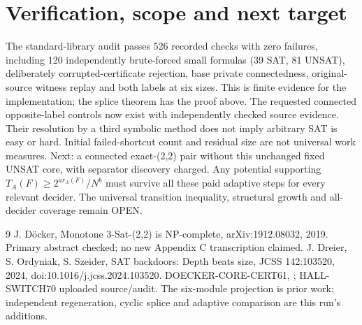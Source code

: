 \documentclass[11pt]{article}
\begin{document}
\section{Verification, scope and next target}
The standard-library audit passes 526 recorded checks with zero failures, including 120 independently brute-forced small formulas (39 SAT, 81 UNSAT), deliberately corrupted-certificate rejection, base private connectedness, original-source witness replay and both labels at six sizes. This is finite evidence for the implementation; the splice theorem has the proof above.
The requested connected opposite-label controls now exist with independently checked source evidence. Their resolution by a third symbolic method does not imply arbitrary SAT is easy or hard. Initial failed-shortcut count and residual size are not universal work measures. Next: a connected exact-(2,2) pair without this unchanged fixed UNSAT core, with separator discovery charged. Any potential supporting $T_A(F)\ge2^{a r_A(F)}/N^b$ must survive all these paid adaptive steps for every relevant decider. The universal transition inequality, structural growth and all-decider coverage remain OPEN.
\begin{thebibliography}{9}
 J. D\"ocker, Monotone 3-Sat-(2,2) is NP-complete, arXiv:1912.08032, 2019. Primary abstract checked; no new Appendix C transcription claimed.
 J. Dreier, S. Ordyniak, S. Szeider, SAT backdoors: Depth beats size, JCSS 142:103520, 2024, doi:10.1016/j.jcss.2024.103520.
 DOECKER-CORE-CERT61, ; HALL-SWITCH70 uploaded source/audit. The six-module projection is prior work; independent regeneration, cyclic splice and adaptive comparison are this run's additions.
\end{thebibliography}
\end{document}
